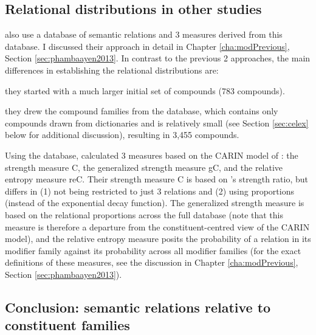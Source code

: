 \subsection{Relational distributions in other studies}
\label{sec:relations-other-studies}

\citet{PhamandBaayen:2013} also use a
database of semantic relations and 3 measures derived from this database. I discussed their
approach in detail in Chapter
\ref{cha:modPrevious}, Section \ref{sec:phambaayen2013}. In contrast
to the previous 2 approaches, the main differences in establishing the
relational distributions are:
\begin{inparaenum}[(1)]
\item they started with a much larger initial set of compounds (783 compounds).
\item they drew the compound families from the 
  database, which contains only compounds drawn from dictionaries and
  is relatively small (see Section \ref{sec:celex} below for
  additional discussion), resulting in
  3,455 compounds.
\end{inparaenum}
Using the  database, \citet{PhamandBaayen:2013} calculated 3
measures based on the CARIN model of \citet{GagneandShoben:1997}: the strength measure C, the generalized
strength measure gC, and the relative entropy measure reC. 
Their strength measure C is based on \citeauthor{GagneandShoben:1997}'s strength ratio, but
differs in (1) not being restricted to just 3 relations and (2) using
proportions (instead of the exponential decay function).  The
generalized strength measure is based on the relational proportions
across the full database (note that this measure is therefore a departure from the constituent-centred view of the
CARIN model), and the relative entropy measure posits the
probability of a relation in its modifier family against its
probability across all modifier families (for the exact definitions of
these measures, see the discussion in Chapter
\ref{cha:modPrevious}, Section \ref{sec:phambaayen2013}).

\subsection[Conclusion: relations relative to families]{Conclusion: semantic relations relative to constituent families}

